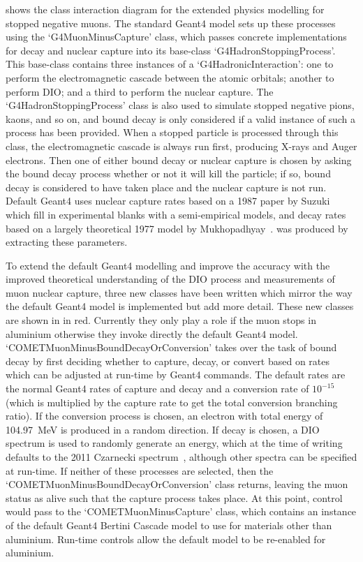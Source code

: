  shows the class interaction diagram for the extended physics modelling for stopped negative muons.
The standard Geant4 model sets up these processes using the `G4MuonMinusCapture' class, which passes concrete implementations for decay and nuclear capture into its base-class `G4HadronStoppingProcess'.
This base-class contains three instances of a `G4HadronicInteraction': one to perform the electromagnetic cascade between the atomic orbitals; another to perform \ac{DIO}; and a third to perform the nuclear capture.
The `G4HadronStoppingProcess' class is also used to simulate stopped negative pions, kaons, and so on, and bound decay is only considered if a valid instance of such a process has been provided.
When a stopped particle is processed through this class, the electromagnetic cascade is always run first, producing X-rays and Auger electrons.
Then one of either bound decay or nuclear capture is chosen by asking the bound decay process whether or not it will kill the particle; if so, bound decay is considered to have taken place and the nuclear capture is not run. 
Default Geant4 uses nuclear capture rates based on a 1987 paper by Suzuki \etal~\cite{Suzuki1987}  which fill in experimental blanks with a semi-empirical models, and decay rates based on a largely theoretical 1977 model by Mukhopadhyay~\cite{Mukhopadhyay:1976hu}.
 was produced by extracting these parameters.

\FigSimulationPhysicsClasses
To extend the default Geant4 modelling and improve the accuracy with the improved theoretical understanding of the \ac{DIO} process and measurements of muon nuclear capture, three new classes have been written which mirror the way the default Geant4 model is implemented but add more detail.
These new classes are shown in  in red.  
Currently they only play a role if the muon stops in aluminium otherwise they invoke directly the default Geant4 model.
`COMETMuonMinusBoundDecayOrConversion' takes over the task of bound decay by first deciding whether to capture, decay, or convert based on rates which can be adjusted at run-time by Geant4 commands.
The default rates are the normal Geant4 rates of capture and decay and a conversion rate of $10^{-15}$ (which is multiplied by the capture rate to get the total conversion branching ratio).
If the conversion process is chosen, an electron with total energy of 104.97~MeV is produced in a random direction.  
If decay is chosen, a \ac{DIO} spectrum is used to randomly generate an energy, which at the time of writing defaults to the 2011 Czarnecki spectrum~\cite{Czarnecki2011}, although other spectra can be specified at run-time.
If neither of these processes are selected, then the `COMETMuonMinusBoundDecayOrConversion' class returns, leaving the muon status as alive such that the capture process takes place.
At this point, control would pass to the `COMETMuonMinusCapture' class, which contains an instance of the default Geant4 Bertini Cascade model to use for materials other than aluminium.
Run-time controls allow the default model to be re-enabled for aluminium.

